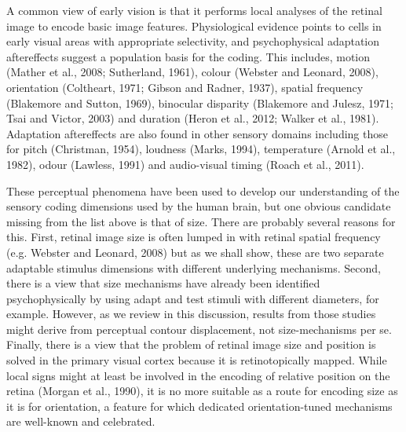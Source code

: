 \documentclass[
]{article}
\begin{document}
A common view of early vision is that it performs local analyses of the retinal image to encode basic image features. Physiological evidence points to cells in early visual areas with appropriate selectivity, and psychophysical adaptation aftereffects suggest a population basis for the coding. This includes, motion (Mather et al., 2008; Sutherland, 1961), colour (Webster and Leonard, 2008), orientation (Coltheart, 1971; Gibson and Radner, 1937), spatial frequency (Blakemore and Sutton, 1969), binocular disparity (Blakemore and Julesz, 1971; Tsai and Victor, 2003) and duration (Heron et al., 2012; Walker et al., 1981). Adaptation aftereffects are also found in other sensory domains including those for pitch (Christman, 1954), loudness (Marks, 1994), temperature (Arnold et al., 1982), odour (Lawless, 1991) and audio-visual timing (Roach et al., 2011).

These perceptual phenomena have been used to develop our understanding of the sensory coding dimensions used by the human brain, but one obvious candidate missing from the list above is that of size. There are probably several reasons for this. First, retinal image size is often lumped in with retinal spatial frequency (e.g. Webster and Leonard, 2008) but as we shall show, these are two separate adaptable stimulus dimensions with different underlying mechanisms. Second, there is a view that size mechanisms have already been identified psychophysically by using adapt and test stimuli with different diameters, for example. However, as we review in this discussion, results from those studies might derive from perceptual contour displacement, not size-mechanisms per se. Finally, there is a view that the problem of retinal image size and position is solved in the primary visual cortex because it is retinotopically mapped. While local signs might at least be involved in the encoding of relative position on the retina (Morgan et al., 1990), it is no more suitable as a route for encoding size as it is for orientation, a feature for which dedicated orientation-tuned mechanisms are well-known and celebrated.
\end{document}
